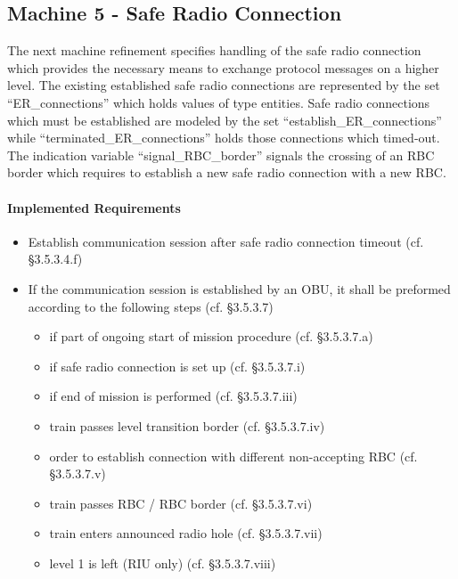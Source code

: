 \documentclass[10pt,a4paper]{article}
\begin{document}


\subsection{Machine 5 - Safe Radio Connection}
\label{sec:machine-5-safe}

The next machine refinement specifies handling of the safe radio connection
which provides the necessary means to exchange protocol messages on a higher
level. The existing established safe radio connections are represented by the
set ``ER\_connections'' which holds values of type entities. Safe radio
connections which must be established are modeled by the set
``establish\_ER\_connections'' while ``terminated\_ER\_connections'' holds those
connections which timed-out. The indication variable ``signal\_RBC\_border''
signals the crossing of an RBC border which requires to establish a new safe
radio connection with a new RBC.

\paragraph{Implemented Requirements}
\label{sec:impl-requ-4}

\begin{itemize}
\item Establish communication session after safe radio connection timeout
  (cf. §3.5.3.4.f)
\item If the communication session is established by an OBU, it shall be
  preformed according to the following steps (cf. §3.5.3.7)
  \begin{itemize}
  \item if part of ongoing start of mission procedure (cf. §3.5.3.7.a)
  \item if safe radio connection is set up (cf. §3.5.3.7.i)
  \item if end of mission is performed (cf. §3.5.3.7.iii)
  \item train passes level transition border (cf. §3.5.3.7.iv)
  \item order to establish connection with different non-accepting RBC
    (cf. §3.5.3.7.v)
  \item train passes RBC / RBC border (cf. §3.5.3.7.vi)
  \item train enters announced radio hole (cf. §3.5.3.7.vii)
  \item level 1 is left (RIU only) (cf. §3.5.3.7.viii)
  \end{itemize}
\end{itemize}


\end{document}
